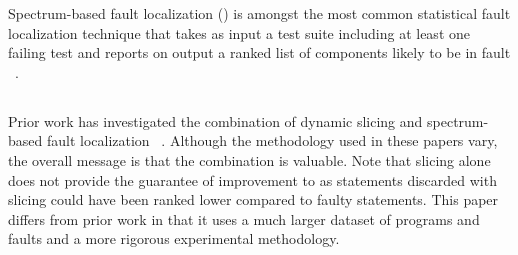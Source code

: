\documentclass{article}
\begin{document}
Spectrum-based fault localization (\sfl) is amongst the most common statistical
fault localization technique that takes as input a test suite including at least
one failing test and reports on output a ranked list of components likely to be
in fault ~\cite{FLSurvey2016,DBLP:conf/kbse/JonesH05,DBLP:journals/smr/LuciaLJTB14,DBLP:journals/jss/AbreuZGG09}.

\subsection{\comb{}}

Prior work has investigated the combination of dynamic slicing and
spectrum-based fault
localization ~\cite{Wotawa:2010:FLB:1848650.1849235,Alves:2011:FUD:2190078.2190115,DBLP:conf/ecai/HoferW12,lei-mao-dai-wang-2012,slicing-sfl-repair}. Although
the methodology used in these papers vary, the overall message is that
the combination is valuable. Note that slicing alone does not provide
the guarantee of improvement to \sfl{} as statements discarded with
slicing could have been ranked lower compared to faulty
statements. This paper differs from prior work in that it uses a much
larger dataset of programs and faults and a more rigorous experimental
methodology.



\end{document}
